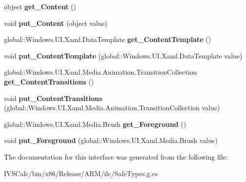 \begin{DoxyCompactItemize}
object {\bfseries get\+\_\+\+Content} ()
\item 
\mbox{\label{interface_windows_1_1_u_i_1_1_xaml_1_1_controls_1_1_i_content_presenter_a92a8239bd5d9c2deaf3a6901d4c33da6}} 
void {\bfseries put\+\_\+\+Content} (object value)
\item 
\mbox{\label{interface_windows_1_1_u_i_1_1_xaml_1_1_controls_1_1_i_content_presenter_a5ba47cb8cb89765bea45f2242ad31a45}} 
global\+::\+Windows.\+U\+I.\+Xaml.\+Data\+Template {\bfseries get\+\_\+\+Content\+Template} ()
\item 
\mbox{\label{interface_windows_1_1_u_i_1_1_xaml_1_1_controls_1_1_i_content_presenter_a74180212284ee21c083ea156f117cb3c}} 
void {\bfseries put\+\_\+\+Content\+Template} (global\+::\+Windows.\+U\+I.\+Xaml.\+Data\+Template value)
\item 
\mbox{\label{interface_windows_1_1_u_i_1_1_xaml_1_1_controls_1_1_i_content_presenter_a0db45f8a30518615e50e4f98e8bcc040}} 
global\+::\+Windows.\+U\+I.\+Xaml.\+Media.\+Animation.\+Transition\+Collection {\bfseries get\+\_\+\+Content\+Transitions} ()
\item 
\mbox{\label{interface_windows_1_1_u_i_1_1_xaml_1_1_controls_1_1_i_content_presenter_af8f3017b639541ee85c82042f3186506}} 
void {\bfseries put\+\_\+\+Content\+Transitions} (global\+::\+Windows.\+U\+I.\+Xaml.\+Media.\+Animation.\+Transition\+Collection value)
\item 
\mbox{\label{interface_windows_1_1_u_i_1_1_xaml_1_1_controls_1_1_i_content_presenter_a95c7018f0564a23c7ab641c21ab2cf47}} 
global\+::\+Windows.\+U\+I.\+Xaml.\+Media.\+Brush {\bfseries get\+\_\+\+Foreground} ()
\item 
\mbox{\label{interface_windows_1_1_u_i_1_1_xaml_1_1_controls_1_1_i_content_presenter_a77229ce3c46ba5f9ecb3fbe3361e9c0a}} 
void {\bfseries put\+\_\+\+Foreground} (global\+::\+Windows.\+U\+I.\+Xaml.\+Media.\+Brush value)
\end{DoxyCompactItemize}


The documentation for this interface was generated from the following file\+:\begin{DoxyCompactItemize}
\item 
I\+V\+S\+Calc/bin/x86/\+Release/\+A\+R\+M/ilc/Safe\+Types.\+g.\+cs\end{DoxyCompactItemize}
